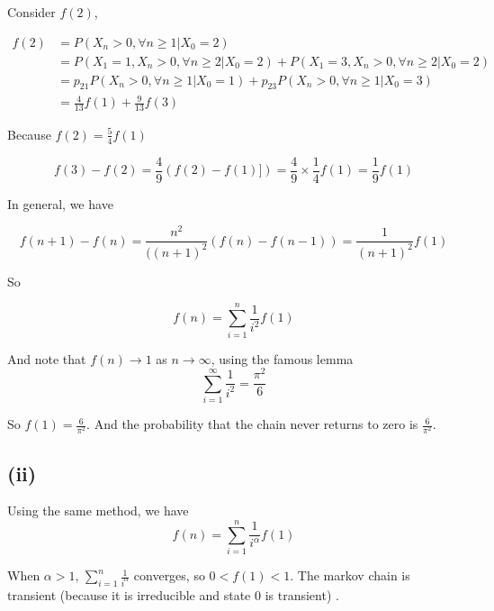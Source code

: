 \documentclass{article}
\begin{document}
Consider $f(2)$,

\begin{equation}
    \begin{aligned}
        f(2) &= P(X_n >0, \forall n\geqslant 1 | X_0 = 2) \\ & = P(X_1 =1, X_n >0,\forall n\geqslant 2 | X_0= 2)  + P(X_1 =3, X_n >0,\forall n\geqslant 2 | X_0 = 2) \\
        & = p_{21} P(X_n >0, \forall n\geqslant1 | X_0 = 1) + p_{23} P(X_n >0, \forall n\geqslant1 | X_0 = 3) \\
        & = \frac{4}{13} f(1) + \frac{9}{13} f(3)
    \end{aligned}
\end{equation}

Because $f(2) = \frac{5}{4} f(1)$

\begin{equation}
    f(3) - f(2) = \frac{4}{9} (f(2)-f(1)])  = \frac{4}{9} \times \frac{1}{4} f(1) = \frac{1}{9} f(1)
\end{equation}

In general, we have

\begin{equation}
    f(n+1) - f(n) = \frac{n^2}{((n+1)^2} (f(n) -f (n-1)) = \frac{1}{(n+1)^2} f(1)
\end{equation}

So 

\begin{equation}
    f(n) = \sum_{i=1}^n \frac{1}{i^2} f(1)
\end{equation}

And note that $f(n) \to 1$ as $n \to \infty$, using the famous lemma \begin{equation}
    \sum_{i=1}^{\infty}  \frac{1}{i^2} = \frac{\pi^2}{6}
\end{equation}

So $f(1)= \frac{6}{\pi^2}$. And the probability that the chain never returns to zero is $\frac{6}{\pi^2}$.


\subsection{(ii)}

Using the same method, we have 
\begin{equation}
    f(n) = \sum_{i=1}^n \frac{1}{i^\alpha} f(1)
\end{equation}

When $\alpha> 1$, $\sum_{i=1}^n \frac{1}{i^\alpha}$ converges, so $0<f(1)<1$. The markov chain is transient (because it is irreducible and state $0$ is transient) .
\end{document}

